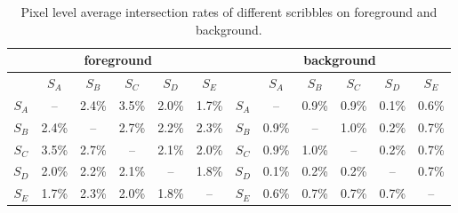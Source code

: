 \documentclass[runningheads,a4paper]{llncs}
\begin{document}
\begin{table}[!h]
\centering
\vspace{-0.2cm}
\caption{Pixel level average intersection rates of different scribbles on foreground and background.}
\begin{tabular}{c|c|c|c|c|c||c|c|c|c|c|c}
\hline
\multicolumn{6}{c||}{foreground} &\multicolumn{6}{c}{background}\\
\hline
& $S_{A}$ & $S_{B}$ & $S_{C}$ & $S_{D}$ & $S_{E}$ && $S_{A}$ & $S_{B}$ & $S_{C}$ & $S_{D}$ & $S_{E}$ \\
\hline
$S_{A}$ & -- & 2.4\% & 3.5\% & 2.0\%& 1.7\% &$S_{A}$ & -- & 0.9\% & 0.9\% & 0.1\%& 0.6\% \\
\hline
$S_{B}$ & 2.4\% & -- & 2.7\% & 2.2\%& 2.3\% &$S_{B}$ & 0.9\% & -- & 1.0\% & 0.2\%& 0.7\% \\
\hline
$S_{C}$ & 3.5\% & 2.7\% & -- & 2.1\%& 2.0\% &$S_{C}$ & 0.9\% & 1.0\% & -- & 0.2\%& 0.7\%\\
\hline
$S_{D}$ & 2.0\% & 2.2\% & 2.1\% & -- & 1.8\% &$S_{D}$ & 0.1\% & 0.2\% & 0.2\% & -- & 0.7\% \\
\hline
$S_{E}$ & 1.7\% & 2.3\% & 2.0\% & 1.8\%& -- &$S_{E}$ & 0.6\% & 0.7\% & 0.7\% & 0.7\% & -- \\
\hline
\end{tabular}
\label{tab:s-ir}
\end{table}


\end{document}
